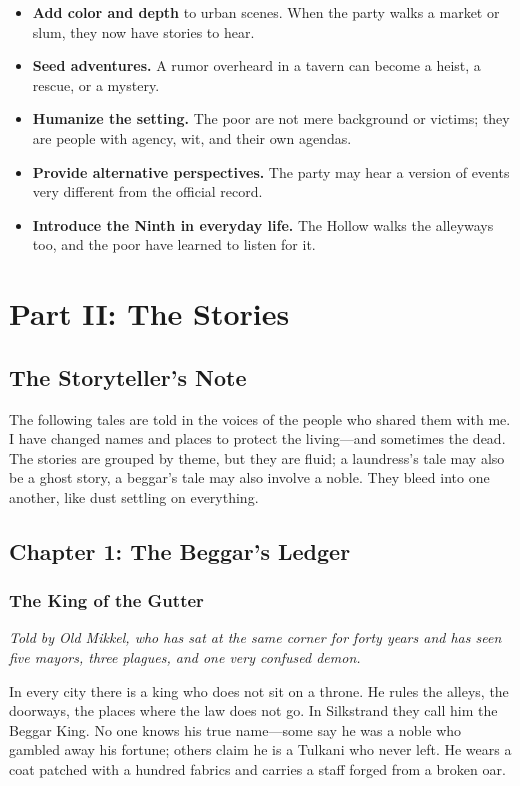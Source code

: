 \documentclass[11pt]{article}
\begin{document}
\begin{itemize}
\item \textbf{Add color and depth} to urban scenes. When the party walks a market or slum, they now have stories to hear.
\item \textbf{Seed adventures.} A rumor overheard in a tavern can become a heist, a rescue, or a mystery.
\item \textbf{Humanize the setting.} The poor are not mere background or victims; they are people with agency, wit, and their own agendas.
\item \textbf{Provide alternative perspectives.} The party may hear a version of events very different from the official record.
\item \textbf{Introduce the Ninth in everyday life.} The Hollow walks the alleyways too, and the poor have learned to listen for it.
\end{itemize}

\section{Part II: The Stories}
\subsection{The Storyteller's Note}
The following tales are told in the voices of the people who shared them with me. I have changed names and places to protect the living—and sometimes the dead. The stories are grouped by theme, but they are fluid; a laundress’s tale may also be a ghost story, a beggar’s tale may also involve a noble. They bleed into one another, like dust settling on everything.

\subsection{Chapter 1: The Beggar's Ledger}
\subsubsection{The King of the Gutter}
\textit{Told by Old Mikkel, who has sat at the same corner for forty years and has seen five mayors, three plagues, and one very confused demon.}

In every city there is a king who does not sit on a throne. He rules the alleys, the doorways, the places where the law does not go. In Silkstrand they call him the Beggar King. No one knows his true name—some say he was a noble who gambled away his fortune; others claim he is a Tulkani who never left. He wears a coat patched with a hundred fabrics and carries a staff forged from a broken oar.
\end{document}
